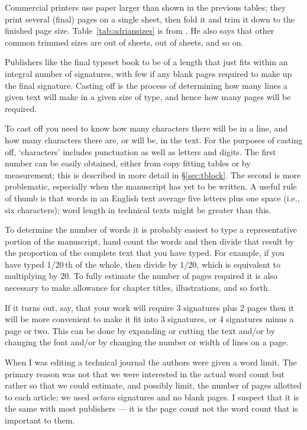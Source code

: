 \documentclass[10pt,a4paper,extrafontsizes]{memoir}
\begin{document}
\begin{paracol}{2}
\switchEng
    Commercial printers use paper larger than shown in the previous tables;
they print several (final) pages on a single sheet, then fold it and trim it
down to the finished page size. Table~\ref{tab:adriansizes} is from
\autocite[p. 59]{ADRIANWILSON93}. He also says that other common trimmed sizes are
 out of  sheets, 
 out of  sheets, and so on.


    Publishers like the final typeset book to be of a length that just fits
within an integral number of signatures, 
with few if any blank pages required
to make up the final signature. Casting off is the
process of determining how many lines a given text will make in a given
size of type, and hence how many pages will be required.

    To cast off you need to know how many characters there will be in
a line, and how many characters there are, or will be, in the text. 
For the purposes of casting off, `characters' includes punctuation as well
as letters and digits. The
first number can be easily obtained, either from copy fitting tables or
by measurement; this is described in more detail in \S\ref{sec:tblock}.
The second is more problematic, especially when the manuscript has yet
to be written. A useful rule of thumb is that words in an English text
average five letters plus one space (i.e., six characters); 
word length in technical texts might be greater than this.

    To determine the number of words it is probably easiest to type a
representative portion of the manuscript, hand count the words and then
divide that result by the proportion of the complete text that you have
typed. For example, if you have typed 1/20\,th of the whole, then divide
by 1/20, which is equivalent to multiplying by 20. To fully estimate
the number of pages required it is also necessary to make allowance for
chapter titles, illustrations, and so forth.

    If it turns out, say, that your work will require 3 signatures plus 2
pages then it will be more convenient to make it fit into 3 signatures,
or 4 signatures minus a page or two. This can be done by expanding or cutting
the text and/or by changing the font 
and/or by changing the number or width
of lines on a page.

    When I was editing a technical journal the authors were given a word 
limit. The primary reason was not that we were interested in the actual
word count but rather so that we could estimate, and possibly limit, 
the number of pages allotted
to each article; we used \emph{octavo} 
signatures and no blank pages. 
I suspect that it is
the same with most publishers --- it is the page count not the word count
that is important to them.


\end{paracol}
\end{document}
